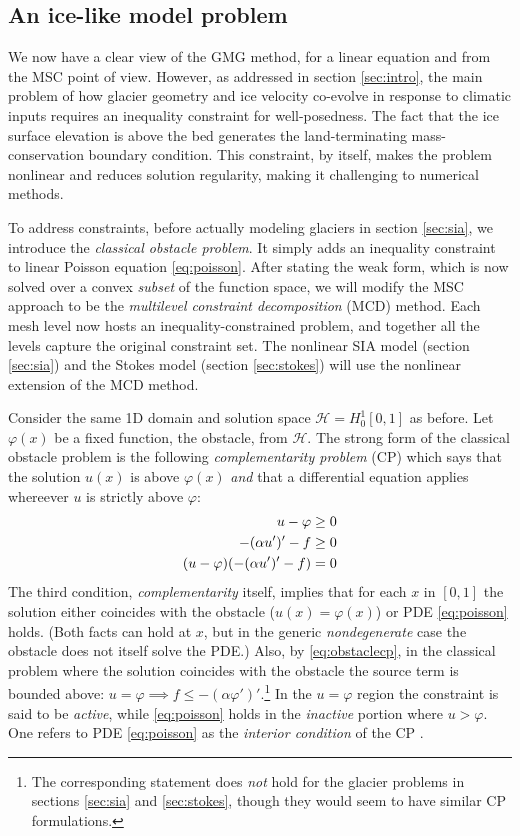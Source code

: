 \documentclass[letterpaper,final,12pt,reqno]{amsart}
\theoremstyle{claim}
\numberwithin{equation}{section}
\numberwithin{figure}{section}
\numberwithin{table}{section}
\numberwithin{theorem}{section}
\begin{document}
\subsection*{An ice-like model problem}  We now have a clear view of the GMG method, for a linear equation and from the MSC point of view.  However, as addressed in section \ref{sec:intro}, the main problem of how glacier geometry and ice velocity co-evolve in response to climatic inputs requires an inequality constraint for well-posedness.  The fact that the ice surface elevation is above the bed generates the land-terminating mass-conservation boundary condition.  This constraint, by itself, makes the problem nonlinear and reduces solution regularity, making it challenging to numerical methods.

To address constraints, before actually modeling glaciers in section \ref{sec:sia}, we introduce the \emph{classical obstacle problem}.  It simply adds an inequality constraint to linear Poisson equation \eqref{eq:poisson}.  After stating the weak form, which is now solved over a convex \emph{subset} of the function space, we will modify the MSC approach to be the \emph{multilevel constraint decomposition} (MCD) method.  Each mesh level now hosts an inequality-constrained problem, and together all the levels capture the original constraint set.  The nonlinear SIA model (section \ref{sec:sia}) and the Stokes model (section \ref{sec:stokes}) will use the nonlinear extension of the MCD method.

Consider the same 1D domain and solution space $\mathcal{H}=H_0^1[0,1]$ as before.  Let $\varphi(x)$ be a fixed function, the obstacle, from $\mathcal{H}$.  The strong form of the classical obstacle problem is the following \emph{complementarity problem} (CP) \cite{Bueler2021,KinderlehrerStampacchia1980} which says that the solution $u(x)$ is above $\varphi(x)$ \emph{and} that a differential equation applies whereever $u$ is strictly above $\varphi$:
\begin{align}
  u - \varphi &\ge 0 \label{eq:obstaclecp} \\
  -(\alpha u')'-f &\ge 0 \notag \\
  (u-\varphi)(-(\alpha u')'-f) &= 0 \notag
\end{align}
The third condition, \emph{complementarity} itself, implies that for each $x$ in $[0,1]$ the solution either coincides with the obstacle ($u(x)=\varphi(x)$) or PDE \eqref{eq:poisson} holds.  (Both facts can hold at $x$, but in the generic \emph{nondegenerate} \cite{KinderlehrerStampacchia1980} case the obstacle does not itself solve the PDE.)  Also, by \eqref{eq:obstaclecp}, in the classical problem where the solution coincides with the obstacle the source term is bounded above: $u=\varphi \implies f \le -(\alpha\varphi')'$.\footnote{The corresponding statement does \emph{not} hold for the glacier problems in sections \ref{sec:sia} and \ref{sec:stokes}, though they would seem to have similar CP formulations.}  In the $u=\varphi$ region the constraint is said to be \emph{active}, while \eqref{eq:poisson} holds in the \emph{inactive} portion where $u>\varphi$.  One refers to PDE \eqref{eq:poisson} as the \emph{interior condition} of the CP \cite{KinderlehrerStampacchia1980}.
\end{document}
